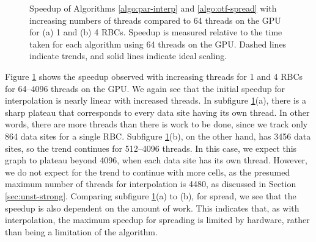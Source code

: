 \begin{figure}[ht]
\caption{%
    Speedup of Algorithms \ref{algo:par-interp} and \ref{algo:otf-spread} with
    increasing numbers of threads compared to 64 threads on the GPU for (a) 1
    and (b) 4 RBCs. Speedup is measured relative to the time taken for each
    algorithm using 64 threads on the GPU. Dashed lines indicate trends, and
    solid lines indicate ideal scaling.
}
\label{fig:str-strong}
\end{figure}

Figure \ref{fig:str-strong} shows the speedup observed with increasing threads
for 1 and 4 RBCs for 64--4096 threads on the GPU. We again see that the initial
speedup for interpolation is nearly linear with increased threads. In subfigure
\ref{fig:str-strong}(a), there is a sharp plateau that corresponds to every
data site having its own thread. In other words, there are more threads than
there is work to be done, since we track only 864 data sites for a single RBC.
Subfigure \ref{fig:str-strong}(b), on the other hand, has 3456 data sites, so
the trend continues for 512--4096 threads. In this case, we expect this graph
to plateau beyond 4096, when each data site has its own thread. However, we do
not expect for the trend to continue with more cells, as the presumed maximum
number of threads for interpolation is 4480, as discussed in Section
\ref{sec:unst-strong}. Comparing subfigure \ref{fig:str-strong}(a)
to (b), for spread, we see that the speedup is also dependent on the amount of
work. This indicates that, as with interpolation, the maximum speedup for
spreading is limited by hardware, rather than being a limitation of the
algorithm.

